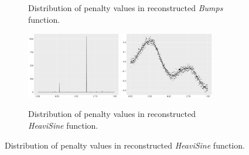 \begin{figure}
\begin{subfigure}{\textwidth}
    \caption{Distribution of penalty values in reconstructed \textit{Bumps} function.}
    \end{subfigure}
    \begin{subfigure}{\textwidth}
    \centering
    \includegraphics[width=0.45\textwidth]{Chapters/02TractorSplineTheory/plot/ggplot/ggHeaviSinePenaltyBar.pdf}
    \includegraphics[width=0.45\textwidth]{Chapters/02TractorSplineTheory/plot/ggplot/ggHeaviSinePenaltyLine.pdf}
    \caption{Distribution of penalty values in reconstructed \textit{HeaviSine} function.}
    \end{subfigure}
\end{figure}

